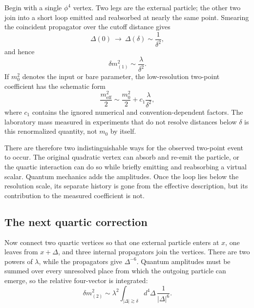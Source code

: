 Begin with a single \(\phi^4\) vertex. Two legs are the external particle;
the other two join into a short loop emitted and reabsorbed at nearly the same
point. Smearing the coincident propagator over the cutoff distance gives
\begin{equation}
\Delta(0)\ \longrightarrow\ \Delta(\delta)\sim\frac{1}{\delta^2},
\end{equation}
and hence
\begin{equation}
\delta m^2_{(1)}\sim\frac{\lambda}{\delta^2}.
\label{eq:one-loop-scalar-mass}
\end{equation}
If \(m_0^2\) denotes the input or bare parameter, the low-resolution
two-point coefficient has the schematic form
\begin{equation}
\frac{m_{\mathrm{eff}}^2}{2}
\sim
\frac{m_0^2}{2}
+c_1\frac{\lambda}{\delta^2},
\label{eq:first-renormalized-mass}
\end{equation}
where \(c_1\) contains the ignored numerical and convention-dependent
factors. The laboratory mass measured in experiments that do not resolve
distances below \(\delta\) is this renormalized quantity, not \(m_0\) by
itself.

There are therefore two indistinguishable ways for the observed two-point
event to occur. The original quadratic vertex can absorb and re-emit the
particle, or the quartic interaction can do so while briefly emitting and
reabsorbing a virtual scalar. Quantum mechanics adds the amplitudes. Once the
loop lies below the resolution scale, its separate history is gone from the
effective description, but its contribution to the measured coefficient is
not.

\subsection{The next quartic correction}

Now connect two quartic vertices so that one external particle enters at
\(x\), one leaves from \(x+\Delta\), and three internal propagators join the
vertices. There are two powers of \(\lambda\), while the propagators give
\(\Delta^{-6}\). Quantum amplitudes must be summed over every unresolved
place from which the outgoing particle can emerge, so the relative
four-vector is integrated:
\begin{equation}
\delta m^2_{(2)}
\sim
\lambda^2
\int_{|\Delta|\gtrsim\delta}
d^4\Delta\,\frac{1}{|\Delta|^6}.
\label{eq:two-loop-power-count}
\end{equation}

